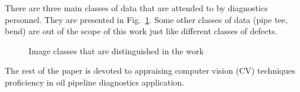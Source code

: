 There are three main classes of data that are attended to by diagnostics personnel.
They are presented in Fig.~\ref{ris:classes}.
Some other classes of data (pipe tee, bend) are out of the scope of this work just like different classes of defects.
\begin{figure}[ht]
	\caption{Image classes that are distinguished in the work}
	\label{ris:classes}
\end{figure}

The rest of the paper is devoted to appraising computer vision (CV) techniques proficiency in oil pipeline diagnostics application.

